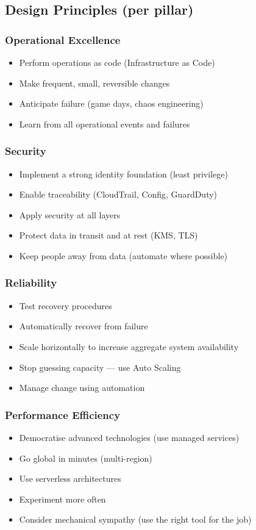 \subsection{Design Principles (per pillar)}

\subsubsection{Operational Excellence}
\begin{itemize}
  \item Perform operations as code (Infrastructure as Code)
  \item Make frequent, small, reversible changes
  \item Anticipate failure (game days, chaos engineering)
  \item Learn from all operational events and failures
\end{itemize}

\subsubsection{Security}
\begin{itemize}
  \item Implement a strong identity foundation (least privilege)
  \item Enable traceability (CloudTrail, Config, GuardDuty)
  \item Apply security at all layers
  \item Protect data in transit and at rest (KMS, TLS)
  \item Keep people away from data (automate where possible)
\end{itemize}

\subsubsection{Reliability}
\begin{itemize}
  \item Test recovery procedures
  \item Automatically recover from failure
  \item Scale horizontally to increase aggregate system availability
  \item Stop guessing capacity — use Auto Scaling
  \item Manage change using automation
\end{itemize}

\subsubsection{Performance Efficiency}
\begin{itemize}
  \item Democratise advanced technologies (use managed services)
  \item Go global in minutes (multi-region)
  \item Use serverless architectures
  \item Experiment more often
  \item Consider mechanical sympathy (use the right tool for the job)
\end{itemize}


